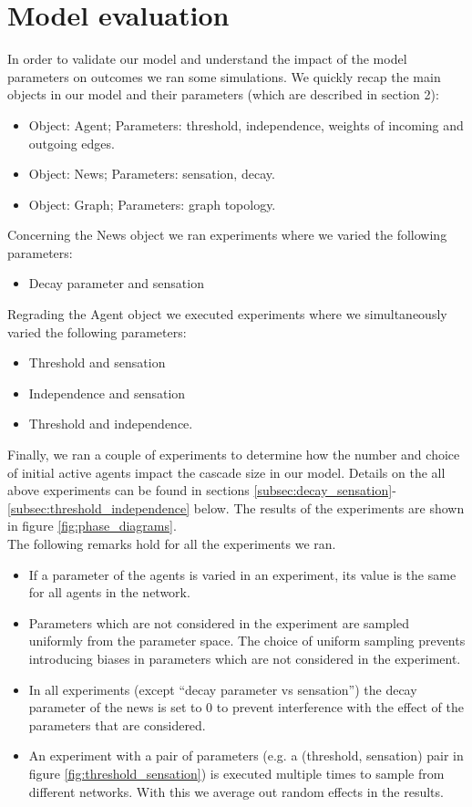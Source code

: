 \documentclass[10pt]{article}
\begin{document}
\section{Model evaluation}
In order to validate our model and understand the impact of the model parameters on outcomes we ran some simulations. We quickly recap the main objects in our model and their parameters (which are described in section 2):
\begin{itemize}
    \item Object: Agent; Parameters: threshold, independence, weights of incoming and outgoing edges. 
    \item Object: News; Parameters: sensation, decay.
    \item Object: Graph; Parameters: graph topology.
\end{itemize}
Concerning the News object we ran experiments where we varied the following parameters:
\begin{itemize}
    \item Decay parameter and sensation
\end{itemize}
Regrading the Agent object we executed experiments where we simultaneously varied the following parameters:
\begin{itemize}
    \item Threshold and sensation
    \item Independence and sensation
    \item Threshold and independence.
\end{itemize}
Finally, we ran a couple of experiments to determine how the number and choice of initial active agents impact the cascade size in our model.
Details on the all above experiments can be found in sections \ref{subsec:decay_sensation}-\ref{subsec:threshold_independence} below. The results of the experiments are shown in figure \ref{fig:phase_diagrams}. \\

The following remarks hold for all the experiments we ran.
\begin{itemize}
    \item If a parameter of the agents is varied in an experiment, its value is the same for all agents in the network.
    \item Parameters which are not considered in the experiment are sampled uniformly from the parameter space. The choice of uniform sampling prevents introducing biases in parameters which are not considered in the experiment.
    \item In all experiments (except ``decay parameter vs sensation'') the decay parameter of the news is set to 0 to prevent interference with the effect of the parameters that are considered.
    \item An experiment with a pair of parameters (e.g. a (threshold, sensation) pair in figure \ref{fig:threshold_sensation}) is executed multiple times to sample from different networks. With this we average out random effects in the results.
\end{itemize}
\end{document}
